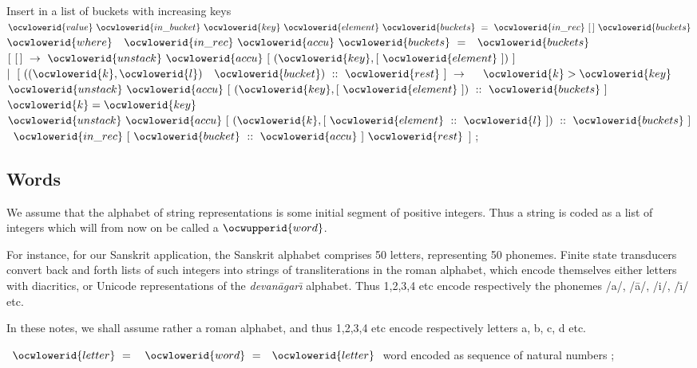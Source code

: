 \documentclass[12pt]{article}
\begin{document}
\ocwendcode{}\ocwindent{0.00em}
Insert in a list of buckets with increasing keys 
\ocweol
\label{../ML/list2.ml:5027}%
\medskip
\ocwbegincode{}\ocwindent{0.00em}
$\ocwlowerid{value}~\ocwlowerid{in\_bucket}~\ocwlowerid{key}~\ocwlowerid{element}~\ocwlowerid{buckets}~=~\ocwlowerid{in\_rec}~[\,]~\ocwlowerid{buckets}$\ocweol
\ocwindent{1.00em}
$\ocwlowerid{where}~$~$\ocwlowerid{in\_rec}~\ocwlowerid{accu}~\ocwlowerid{buckets}~=~$~$\ocwlowerid{buckets}~$~\ocweol
\ocwindent{2.50em}
$[~[\,]~\rightarrow{}~\ocwlowerid{unstack}~\ocwlowerid{accu}~[~(\ocwlowerid{key},[~\ocwlowerid{element}~])~]$\ocweol
\ocwindent{2.50em}
$\mid{}~[~((\ocwlowerid{k},\ocwlowerid{l})~$~$\ocwlowerid{bucket})~::~\ocwlowerid{rest}~]~\rightarrow{}~$\ocweol
\ocwindent{3.50em}
~$\ocwlowerid{k}>\ocwlowerid{key}~$~$\ocwlowerid{unstack}~\ocwlowerid{accu}~[~(\ocwlowerid{key},[~\ocwlowerid{element}~])~::~\ocwlowerid{buckets}~]$\ocweol
\ocwindent{3.50em}
~~$\ocwlowerid{k}=\ocwlowerid{key}~$~$\ocwlowerid{unstack}~\ocwlowerid{accu}~[~(\ocwlowerid{k},[~\ocwlowerid{element}~::~\ocwlowerid{l}~])~::~\ocwlowerid{buckets}~]$\ocweol
\ocwindent{3.50em}
~$\ocwlowerid{in\_rec}~[~\ocwlowerid{bucket}~::~\ocwlowerid{accu}~]~\ocwlowerid{rest}$\ocweol
\ocwindent{2.50em}
$]$\ocweol
\ocwindent{0.00em}
;\ocweol
\ocwendcode{}\subsection{Words}

We assume that the alphabet of string representations is
some initial segment of positive integers. Thus a string is coded as
a list of integers which will from now on be called a 
\ocwbegincode{}$\ocwupperid{word}$\ocwendcode{}. %

For instance, for our Sanskrit application, the Sanskrit alphabet 
comprises 50 letters, representing 50 phonemes. Finite state transducers 
convert back and forth lists of such integers into strings of 
transliterations in the roman alphabet, which encode themselves either
letters with diacritics, or Unicode representations of the 
{\sl devan\=agar{\=\i}} alphabet. Thus 1,2,3,4 etc encode respectively
the phonemes /a/, /\=a/, /i/, /{\=\i}/ etc. 

In these notes, we shall assume rather a roman alphabet, and thus 1,2,3,4 etc 
encode respectively letters a, b, c, d etc. 

\label{../ML/word.ml:0}%
\label{../ML/word.ml:647}%
\ocwbegincode{}\ocwindent{0.00em}
~$\ocwlowerid{letter}~=~$\ocweol
\ocwindent{0.00em}
~$\ocwlowerid{word}~=~$~$\ocwlowerid{letter}~$\ocwbc{} word encoded as sequence of natural numbers \ocwec{}\ocweol
\ocwindent{0.00em}
;\medskip
\end{document}
